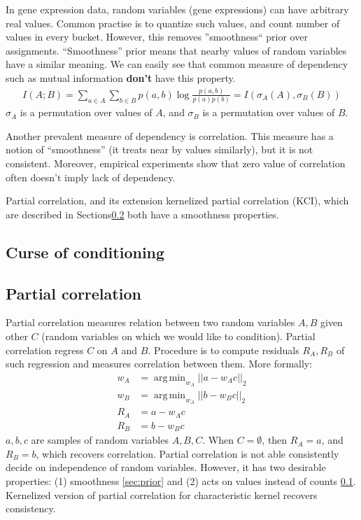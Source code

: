\documentclass{article} %
\DeclareMathOperator*{\argmin}{arg\,min}
\begin{document}
In gene expression data, random variables (gene expressions) can 
have arbitrary real values. Common practise is to quantize such values,
and count number of values in every bucket. However, this removes 
''smoothness`` prior over assignments. ``Smoothness'' prior means that
nearby values of random variables have a similar meaning. We can easily see
that common measure of dependency such as mutual information {\bf don't} have 
this property. 
\begin{align*}
  I(A;B)=\sum_{a \in A}\sum_{b \in B} p(a, b)\log{\frac{p(a, b)}{p(a)p(b)}}=I(\sigma_A(A), \sigma_B(B))
\end{align*}
$\sigma_A$ is a permutation over values of $A$, and $\sigma_B$ is
a permutation over values of $B$.



Another prevalent measure of dependency is correlation. This measure
has a notion of ``smoothness'' (it treats near by values similarly), but
it is not consistent. Moreover, empirical experiments show that zero value
of correlation often doesn't imply lack of dependency. 

Partial correlation, and its extension kernelized partial correlation (KCI), which are described 
in Sections\ref{sec:corr} both have a smoothness properties.


\subsection{Curse of conditioning}\label{sec:curse}

\subsection{Partial correlation}\label{sec:corr}
Partial correlation measures relation between two random variables $A, B$ given other $C$ (random 
variables on which we would like to condition). Partial correlation regress $C$ on $A$ and $B$. 
Procedure is to compute residuals $R_A, R_B$ of such regression and measures correlation between them. More formally:
\begin{align*}
  w_A &= \argmin_{w_A} ||a - w_A c||_{2} \\
  w_B &= \argmin_{w_A} ||b - w_B c||_{2} \\
  R_A &= a - w_A c \\
  R_B &= b - w_B c
\end{align*}
$a, b, c$ are samples of random variables $A, B, C$. When $C = \emptyset$, then $R_A = a$, and $R_B = b$, which
recovers correlation. Partial correlation is not able consistently decide
on independence of random variables. However, it has two desirable properties: (1) smoothness \ref{sec:prior} and (2)
acts on values instead of counts \ref{sec:curse}. Kernelized version of partial correlation for 
characteristic kernel recovers consistency.
\end{document}
